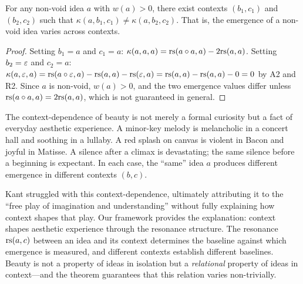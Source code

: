 \begin{theorem}
\label{thm:beauty-context-dependent}
For any non-void idea $a$ with $w(a) > 0$, there exist contexts $(b_1, c_1)$ and $(b_2, c_2)$ such that $\kappa(a, b_1, c_1) \neq \kappa(a, b_2, c_2)$.  That is, the emergence of a non-void idea varies across contexts.
\end{theorem}

\begin{proof}
Setting $b_1 = a$ and $c_1 = a$: $\kappa(a, a, a) = \mathrm{rs}(a \circ a, a) - 2\mathrm{rs}(a, a)$.  Setting $b_2 = \varepsilon$ and $c_2 = a$: $\kappa(a, \varepsilon, a) = \mathrm{rs}(a \circ \varepsilon, a) - \mathrm{rs}(a, a) - \mathrm{rs}(\varepsilon, a) = \mathrm{rs}(a, a) - \mathrm{rs}(a, a) - 0 = 0$ by A2 and R2.  Since $a$ is non-void, $w(a) > 0$, and the two emergence values differ unless $\mathrm{rs}(a \circ a, a) = 2\mathrm{rs}(a, a)$, which is not guaranteed in general.
\end{proof}

\begin{interpretation}
\label{interp:contextuality-beauty}
The context-dependence of beauty is not merely a formal curiosity but a fact of everyday aesthetic experience.  A minor-key melody is melancholic in a concert hall and soothing in a lullaby.  A red splash on canvas is violent in Bacon and joyful in Matisse.  A silence after a climax is devastating; the same silence before a beginning is expectant.  In each case, the ``same'' idea $a$ produces different emergence in different contexts $(b, c)$.

Kant struggled with this context-dependence, ultimately attributing it to the ``free play of imagination and understanding'' without fully explaining how context shapes that play.  Our framework provides the explanation: context shapes aesthetic experience through the resonance structure.  The resonance $\mathrm{rs}(a, c)$ between an idea and its context determines the baseline against which emergence is measured, and different contexts establish different baselines.  Beauty is not a property of ideas in isolation but a \emph{relational} property of ideas in context---and the theorem guarantees that this relation varies non-trivially.
\end{interpretation}

